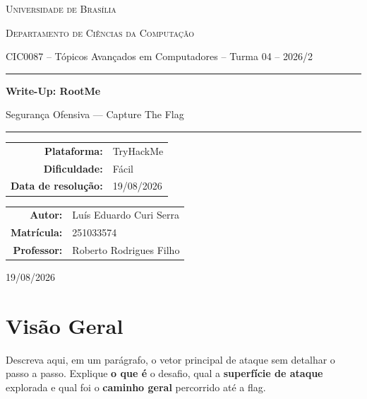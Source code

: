 \documentclass[12pt,a4paper]{article}
\newcommand{\desafioNome}{RootMe}          %
\newcommand{\plataforma}{TryHackMe}                %
\newcommand{\dificuldade}{Fácil}              %
\newcommand{\dataResolucao}{19/08/2026}             %
\newcommand{\autorNome}{Luís Eduardo Curi Serra}                   %
\newcommand{\materia}{CIC0087 -- Tópicos Avançados em Computadores -- Turma 04 -- 2026/2}
\newcommand{\departamento}{Departamento de Ciências da Computação}
\newcommand{\matricula}{251033574}
\newcommand{\professor}{Roberto Rodrigues Filho}
\newcommand{\universidade}{Universidade de Brasília}
\begin{document}
\begin{titlepage}
  \thispagestyle{empty}
  \centering
  {\scshape \universidade \par}
  {\scshape \departamento \par}
  \vspace{0.4cm}
  {\small \materia \par}
  \vspace{2.5cm}

  \rule{\linewidth}{0.4pt}\par
  \vspace{0.6cm}
  {\huge \bfseries Write-Up: \desafioNome \par}
  \vspace{0.4cm}
  {\large Segurança Ofensiva --- Capture The Flag \par}
  \vspace{0.6cm}
  \rule{\linewidth}{0.4pt}\par

  \vspace{2.0cm}
  \begin{tabular}{rl}
    \textbf{Plataforma:}       & \plataforma       \\[4pt]
    \textbf{Dificuldade:}      & \dificuldade      \\[4pt]
    \textbf{Data de resolução:}& \dataResolucao    \\
  \end{tabular}

  \vfill

  \begin{tabular}{rl}
    \textbf{Autor:}     & \autorNome  \\[4pt]
    \textbf{Matrícula:} & \matricula  \\[4pt]
    \textbf{Professor:} & \professor  \\
  \end{tabular}

  \vspace{1.2cm}
  {\small \dataResolucao \par}
\end{titlepage}

\newpage
\tableofcontents
\thispagestyle{fancy}
\newpage

\section{Visão Geral}
Descreva aqui, em um parágrafo, o vetor principal de ataque sem detalhar o
passo a passo. Explique \textbf{o que é} o desafio, qual a \textbf{superfície de
ataque} explorada e qual foi o \textbf{caminho geral} percorrido até a flag.
\end{document}
